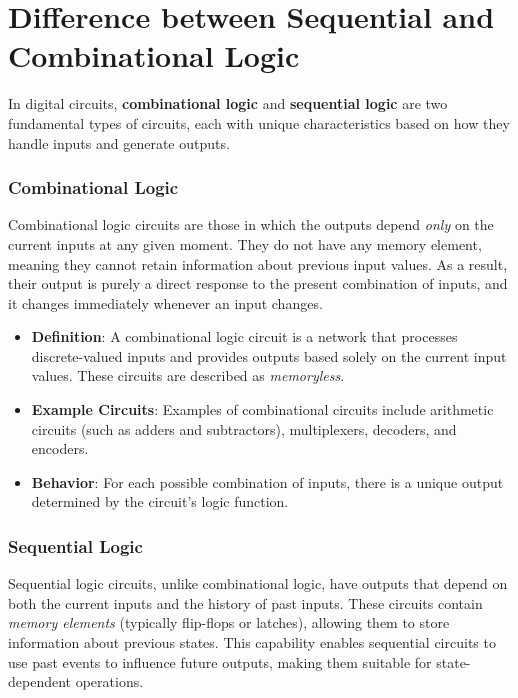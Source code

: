 \documentclass[12pt]{article}
\begin{document}
\section*{Difference between Sequential and Combinational Logic}

In digital circuits, \textbf{combinational logic} and \textbf{sequential logic} are two fundamental types of circuits, each with unique characteristics based on how they handle inputs and generate outputs.

\subsubsection*{Combinational Logic}
Combinational logic circuits are those in which the outputs depend \textit{only} on the current inputs at any given moment. They do not have any memory element, meaning they cannot retain information about previous input values. As a result, their output is purely a direct response to the present combination of inputs, and it changes immediately whenever an input changes.

\begin{itemize}
	\item \textbf{Definition}: A combinational logic circuit is a network that processes discrete-valued inputs and provides outputs based solely on the current input values. These circuits are described as \textit{memoryless}.
	\item \textbf{Example Circuits}: Examples of combinational circuits include arithmetic circuits (such as adders and subtractors), multiplexers, decoders, and encoders.
	\item \textbf{Behavior}: For each possible combination of inputs, there is a unique output determined by the circuit’s logic function.
\end{itemize}

\subsubsection*{Sequential Logic}
Sequential logic circuits, unlike combinational logic, have outputs that depend on both the current inputs and the history of past inputs. These circuits contain \textit{memory elements} (typically flip-flops or latches), allowing them to store information about previous states. This capability enables sequential circuits to use past events to influence future outputs, making them suitable for state-dependent operations.
\end{document}
